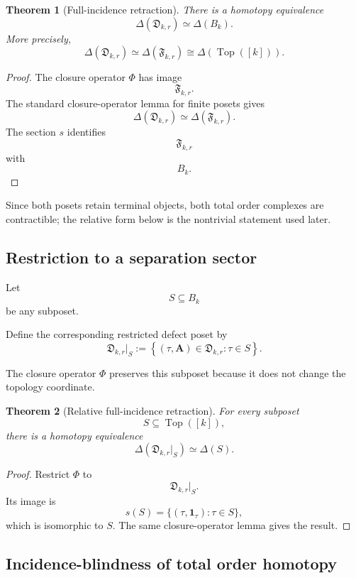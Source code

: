 \documentclass[11pt]{article}
\theoremstyle{plain}
\newtheorem{theorem}{Theorem}[section]
\theoremstyle{definition}
\begin{document}
\begin{theorem}[Full-incidence retraction]
\label{thm:full-incidence-retraction}
There is a homotopy equivalence
\[
\Delta(\mathfrak D_{k,r})
\simeq
\Delta(B_k).
\]
More precisely,
\[
\Delta(\mathfrak D_{k,r})
\simeq
\Delta(\mathfrak F_{k,r})
\cong
\Delta(\operatorname{Top}([k])).
\]
\end{theorem}

\begin{proof}
The closure operator $\Phi$ has image
\[
\mathfrak F_{k,r}.
\]
The standard closure-operator lemma for finite posets
\citep{Barmak2011} gives
\[
\Delta(\mathfrak D_{k,r})
\simeq
\Delta(\mathfrak F_{k,r}).
\]
The section $s$ identifies
\[
\mathfrak F_{k,r}
\]
with
\[
B_k.
\]
\end{proof}

Since both posets retain terminal objects, both total order complexes are contractible; the relative form below is the nontrivial statement used later.

\subsection{Restriction to a separation sector}
\label{subsec:restricted-retraction}

Let
\[
S\subseteq B_k
\]
be any subposet.

Define the corresponding restricted defect poset by
\[
\mathfrak D_{k,r}|_S
:=
\left\{
(\tau,\mathbf A)\in\mathfrak D_{k,r}:
\tau\in S
\right\}.
\]

The closure operator $\Phi$ preserves this subposet because it does not
change the topology coordinate.

\begin{theorem}[Relative full-incidence retraction]
\label{thm:relative-full-incidence-retraction}
For every subposet
\[
S\subseteq\operatorname{Top}([k]),
\]
there is a homotopy equivalence
\[
\Delta\!\left(
\mathfrak D_{k,r}|_S
\right)
\simeq
\Delta(S).
\]
\end{theorem}

\begin{proof}
Restrict $\Phi$ to
\[
\mathfrak D_{k,r}|_S.
\]
Its image is
\[
s(S)
=
\{(\tau,\mathbf1_\tau):\tau\in S\},
\]
which is isomorphic to $S$.  The same closure-operator lemma gives the result.
\end{proof}


\subsection{Incidence-blindness of total order homotopy}
\label{subsec:incidence-blindness}
\end{document}
